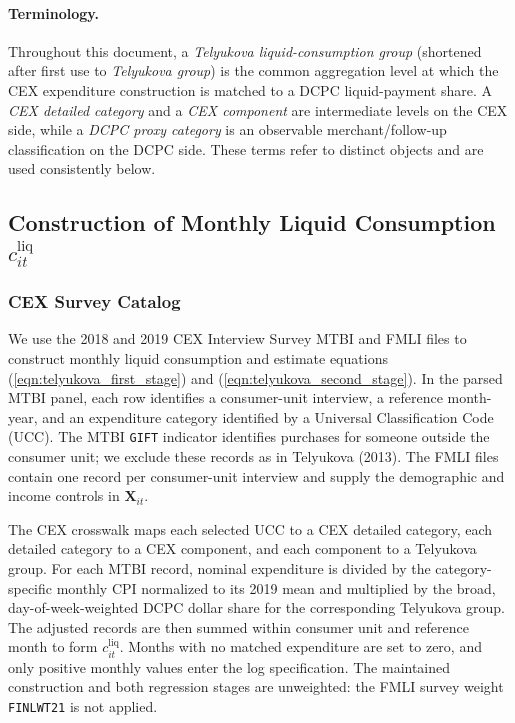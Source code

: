 \documentclass[11pt]{article}
\begin{document}
\paragraph{Terminology.}
Throughout this document, a \emph{Telyukova liquid-consumption group} (shortened after first use to \emph{Telyukova group}) is the common aggregation level at which the CEX expenditure construction is matched to a DCPC liquid-payment share. A \emph{CEX detailed category} and a \emph{CEX component} are intermediate levels on the CEX side, while a \emph{DCPC proxy category} is an observable merchant/follow-up classification on the DCPC side. These terms refer to distinct objects and are used consistently below.

\subsection{Construction of Monthly Liquid Consumption \texorpdfstring{$c^{\mathrm{liq}}_{it}$}{c-liq}}



\subsubsection{CEX Survey Catalog}

We use the 2018 and 2019 CEX Interview Survey MTBI and FMLI files to construct monthly liquid consumption and estimate equations (\ref{eqn:telyukova_first_stage}) and (\ref{eqn:telyukova_second_stage}). In the parsed MTBI panel, each row identifies a consumer-unit interview, a reference month-year, and an expenditure category identified by a Universal Classification Code (UCC). The MTBI \lstinline|GIFT| indicator identifies purchases for someone outside the consumer unit; we exclude these records as in Telyukova (2013). The FMLI files contain one record per consumer-unit interview and supply the demographic and income controls in $\mathbf{X}_{it}$.

The CEX crosswalk maps each selected UCC to a CEX detailed category, each detailed category to a CEX component, and each component to a Telyukova group. For each MTBI record, nominal expenditure is divided by the category-specific monthly CPI normalized to its 2019 mean and multiplied by the broad, day-of-week-weighted DCPC dollar share for the corresponding Telyukova group. The adjusted records are then summed within consumer unit and reference month to form $c^{\mathrm{liq}}_{it}$. Months with no matched expenditure are set to zero, and only positive monthly values enter the log specification. The maintained construction and both regression stages are unweighted: the FMLI survey weight \lstinline|FINLWT21| is not applied.
\end{document}
